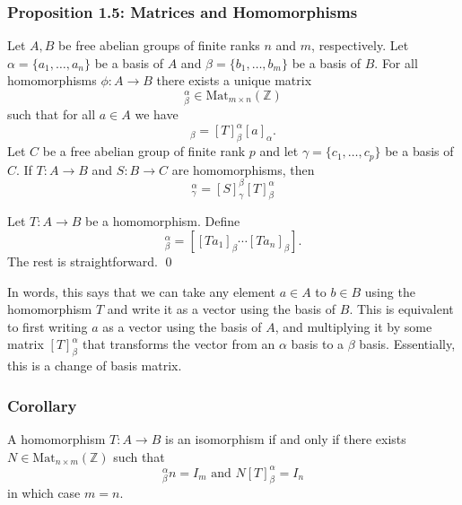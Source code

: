 \documentclass{article}
\renewenvironment{proof}{{\bfseries\color{blue1} Proof:}}{\qed}
\begin{document}
\subsubsection{Proposition 1.5: Matrices and Homomorphisms}
\begin{idea}
    Let $A,B$ be free abelian groups of finite ranks $n$ and $m$, respectively. Let $\alpha=\{a_1,\dots,a_n\}$ be a basis of $A$ and $\beta=\{b_1,\dots,b_m\}$ be a basis of $B$. For all homomorphisms $\phi: A\rightarrow B$ there exists a unique matrix
    \begin{equation*}
        [T]^\alpha_\beta \in \text{Mat}_{m\times n}(\mathbb{Z})
    \end{equation*}
    such that for all $a\in A$ we have
    \begin{equation*}
        [Ta]_\beta = [T]^\alpha_\beta [a]_\alpha.
    \end{equation*}
    Let $C$ be a free abelian group of finite rank $p$ and let $\gamma = \{c_1,\dots,c_p\}$ be a basis of $C$. If $T: A\rightarrow B$ and $S: B\rightarrow C$ are homomorphisms, then
    \begin{equation*}
        [S \circ T]^\alpha_\gamma = [S]^\beta_\gamma [T]^\alpha_\beta
    \end{equation*}
\end{idea}
\begin{proof}
    Let $T:A\rightarrow B$ be a homomorphism. Define
    \begin{equation*}
        [T]^\alpha_\beta = [[Ta_1]_\beta \cdots [Ta_n]_\beta].
    \end{equation*}
    The rest is straightforward.
\end{proof}

In words, this says that we can take any element $a \in A$ to $b \in B$ using the homomorphism $T$ and write it as a vector using the basis of $B$. This is equivalent to first writing $a$ as a vector using the basis of $A$, and multiplying it by some matrix $[T]^\alpha_\beta$ that transforms the vector from an $\alpha$ basis to a $\beta$ basis. Essentially, this is a change of basis matrix. 
\subsubsection{Corollary}
\begin{idea}
    A homomorphism $T:A\rightarrow B$ is an isomorphism if and only if there exists $N\in \text{Mat}_{n\times m}(\mathbb{Z})$ such that
    \begin{equation*}
        [T]^\alpha_\beta n = I_m \text{ and } N[T]^\alpha_\beta = I_n
    \end{equation*}
    in which case $m=n$.
\end{idea}
\end{document}
